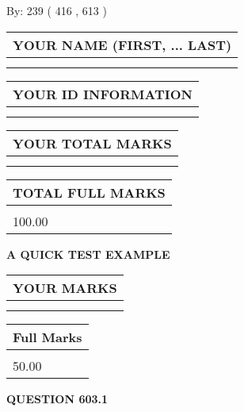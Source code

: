 \documentclass[12pt]{article}
\begin{document}
   
\hspace{1.0in} By: 
 239 ( 416 ,  613 )
   
   
   
   
\newpage 
\setcounter{page}{ 
   603001 } 
   
   
   
   
\noindent\begin{tabular}{|l|}
\hline
YOUR NAME (FIRST, ... LAST)  \\
\hline
 \\ 
 \\ 
\hline
\end{tabular}
\hspace{0.05in} \begin{tabular}{|l|}
\hline
 YOUR   ID   INFORMATION  \\
\hline
 \\ 
 \\ 
\hline
\end{tabular}
   
   
\vspace{0.2in}\noindent\begin{tabular}{|l|}
\hline
YOUR TOTAL MARKS  \\
\hline
 \\ 
 \\ 
\hline
\end{tabular}
\hspace{0.05in} \begin{tabular}{|l|}
\hline
TOTAL FULL MARKS  \\
\hline
 \\ 
100.00 \\
\hline
\end{tabular}
   
   
 \vspace{0.2in}
{\LARGE {\textbf{ A QUICK TEST EXAMPLE}}}
   
   
  
\vspace{0.2in}
  
\noindent\begin{tabular}{|l|}
\hline
 YOUR MARKS  \\
\hline
 \\ 
 \\ 
\hline
\end{tabular}
\hspace{0.05in} \begin{tabular}{|l|}
\hline
 Full Marks  \\
\hline
 \\ 
50.00 \\
\hline
\end{tabular}
{\textbf{\Large{QUESTION
603.1 
}}}
  
\end{document}

